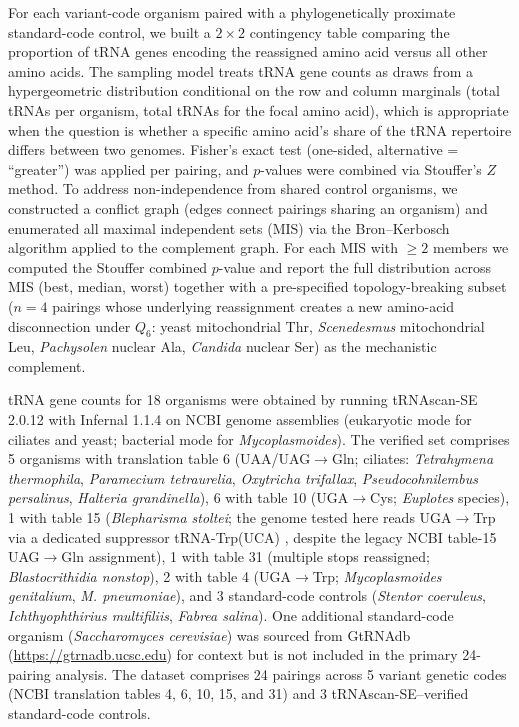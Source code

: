 \documentclass[preprint,11pt,authoryear,a4paper]{elsarticle}
\begin{document}
For each variant-code organism paired with a phylogenetically proximate
standard-code control, we built a \(2 \times 2\) contingency table
comparing the proportion of tRNA genes encoding the reassigned amino
acid versus all other amino acids. The sampling model treats tRNA gene
counts as draws from a hypergeometric distribution conditional on the
row and column marginals (total tRNAs per organism, total tRNAs for the
focal amino acid), which is appropriate when the question is whether a
specific amino acid's share of the tRNA repertoire differs between two
genomes. Fisher's exact test (one-sided, alternative = ``greater'') was
applied per pairing, and \(p\)-values were combined via Stouffer's \(Z\)
method. To address non-independence from shared control organisms, we
constructed a conflict graph (edges connect pairings sharing an
organism) and enumerated all maximal independent sets (MIS) via the
Bron--Kerbosch algorithm applied to the complement graph. For each MIS
with \(\geq 2\) members we computed the Stouffer combined \(p\)-value
and report the full distribution across MIS (best, median, worst)
together with a pre-specified topology-breaking subset (\(n = 4\)
pairings whose underlying reassignment creates a new amino-acid
disconnection under \(Q_{6}\): yeast mitochondrial Thr,
\emph{Scenedesmus} mitochondrial Leu, \emph{Pachysolen} nuclear Ala,
\emph{Candida} nuclear Ser) as the mechanistic complement.

tRNA gene counts for 18 organisms were obtained by running tRNAscan-SE
2.0.12 \citep{chan2019} with Infernal 1.1.4 on NCBI genome assemblies
(eukaryotic mode for ciliates and yeast; bacterial mode for
\emph{Mycoplasmoides}). The verified set comprises 5 organisms with
translation table 6 (UAA/UAG\(\rightarrow\)Gln; ciliates:
\emph{Tetrahymena thermophila}, \emph{Paramecium tetraurelia},
\emph{Oxytricha trifallax}, \emph{Pseudocohnilembus persalinus},
\emph{Halteria grandinella}), 6 with table 10 (UGA\(\rightarrow\)Cys;
\emph{Euplotes} species), 1 with table 15 (\emph{Blepharisma stoltei};
the genome tested here reads UGA\(\rightarrow\)Trp via a dedicated
suppressor tRNA-Trp(UCA) \citep{singh2023}, despite the legacy NCBI
table-15 UAG\(\rightarrow\)Gln assignment), 1 with table 31 (multiple
stops reassigned; \emph{Blastocrithidia nonstop}), 2 with table 4
(UGA\(\rightarrow\)Trp; \emph{Mycoplasmoides genitalium}, \emph{M.
pneumoniae}), and 3 standard-code controls (\emph{Stentor coeruleus},
\emph{Ichthyophthirius multifiliis}, \emph{Fabrea salina}). One
additional standard-code organism (\emph{Saccharomyces cerevisiae}) was
sourced from GtRNAdb (\url{https://gtrnadb.ucsc.edu}) for context but is
not included in the primary 24-pairing analysis. The dataset comprises
24 pairings across 5 variant genetic codes (NCBI translation tables 4,
6, 10, 15, and 31) and 3 tRNAscan-SE--verified standard-code controls.
\end{document}
